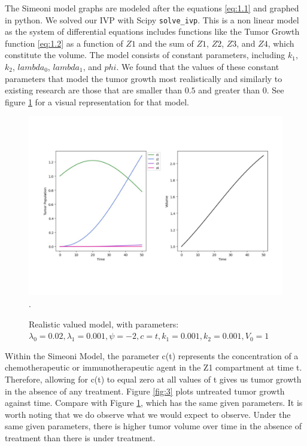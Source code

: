 \documentclass[11pt]{amsart}
\begin{document}
The Simeoni model graphs are modeled after the equations \ref{eq:1.1} and graphed in python. We solved our IVP with Scipy \verb!solve_ivp!. This is a non linear model as the system of differential equations includes functions like the Tumor Growth function \ref{eq:1.2} as a function of $Z1$ and the sum of $Z1$, $Z2$, $Z3$, and $Z4$, which constitute the volume. The model consists of constant parameters, including $k_1$, $k_2$, $lambda_0$, $lambda_1$, and $phi$. We found that the values of these constant parameters that model the tumor growth most realistically and similarly to existing research \cite{Koziol_Falls_Schnitzer_2020} are those that are smaller than $0.5$ and greater than $0$. See figure \ref{fig:2} for a visual representation for that model. 
\begin{figure}[h]
\begin{center} %
\includegraphics[width=\textwidth]{parameters_like_paper.pdf}. %
\end{center}
\caption{Realistic valued model, with parameters: $\lambda_0=0.02, \lambda_1=0.001, \psi=-2, c=t, k_1=0.001, k_2=0.001, V_0=1$}
\label{fig:2}
\end{figure}

Within the Simeoni Model, the parameter c(t) represents the concentration of a chemotherapeutic or immunotherapeutic agent in the Z1 compartment at time t. Therefore, allowing for c(t) to equal zero at all values of t gives us tumor growth in the absence of any treatment. Figure \ref{fig:3} plots untreated tumor growth against time. Compare with Figure \ref{fig:2}, which has the same given parameters. It is worth noting that we do observe what we would expect to observe. Under the same given parameters, there is higher tumor volume over time in the absence of treatment than there is under treatment.
\end{document}
